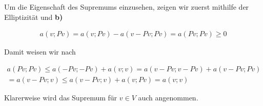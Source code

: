 \begin{solution}
\begin{enumerate}[label = \textbf{\alph*)}]
  Um die Eigenschaft des Supremums einzusehen, zeigen wir zuerst mithilfe der Elliptizität und \textbf{b)}

  \begin{align*}
    a(v; Pv)
    =
    a(v; Pv) - a(v-Pv; Pv)
    =
    a(Pv; Pv)
    \geq
    0
  \end{align*}

  Damit weisen wir nach

  \begin{multline*}
    a(Pv; Pv)
    \leq
    a(-Pv; -Pv) + a(v; v)
    =
    a(v-Pv; v-Pv) + a(v-Pv; Pv) \\
    =
    a(v-Pv; v)
    \leq
    a(v-Pv; v) + a(v; Pv)
    =
    a(v; v)
  \end{multline*}

  Klarerweise wird das Supremum für $v \in V$ auch angenommen.
\end{enumerate}

\end{solution}

